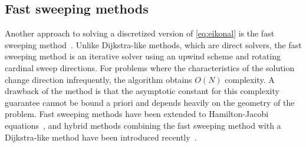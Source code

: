 \documentclass[eikonal.tex]{subfiles}
\begin{document}
\subsection{Fast sweeping methods} Another approach to solving a
discretized version of \cref{eq:eikonal} is the fast sweeping
method~\cite{tsai2003fast,zhao2005fast}. Unlike Dijkstra-like methods,
which are direct solvers, the fast sweeping method is an iterative
solver using an upwind scheme and rotating cardinal sweep
directions. For problems where the characteristics of the solution
change direction infrequently, the algorithm obtains $O(N)$
complexity. A drawback of the method is that the asymptotic constant
for this complexity guarantee cannot be bound a priori and depends
heavily on the geometry of the problem. Fast sweeping methods have
been extended to Hamilton-Jacobi
equations~\cite{kao2004lax,tsai2003fast}, and hybrid methods combining
the fast sweeping method with a Dijkstra-like method have been
introduced recently~\cite{chacon2012fast,chacon2015parallel}.
\end{document}
